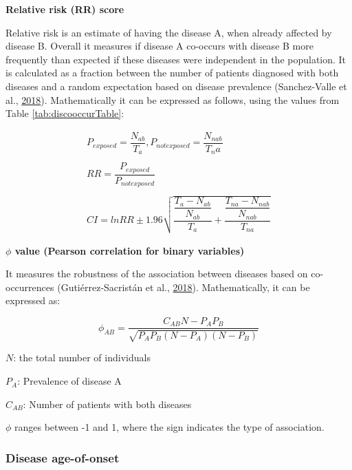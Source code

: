\documentclass[12pt,twoside]{unicam}
\begin{document}
\textbf{Relative risk (RR) score}

Relative risk is an estimate of having the disease A, when already affected by disease B. Overall it measures if disease A co-occurs with disease B more frequently than expected if these diseases were independent in the population. It is calculated as a fraction between the number of patients diagnosed with both diseases and a random expectation based on disease prevalence (Sanchez-Valle et al., \protect\hyperlink{ref-Sanchez-Valle2018}{2018}). Mathematically it can be expressed as follows, using the values from Table \ref{tab:discooccurTable}:

\begin{equation}
\begin{aligned}
    P_{exposed} = \dfrac{N_{ab}}{T_a}, P_{notexposed} = \dfrac{N_{nab}}{T_na} \\\\
    RR = \dfrac{P_{exposed}}{P_{notexposed}} \\\\
    CI = lnRR \pm 1.96 \sqrt{\dfrac{\dfrac{T_a-N_{ab}}{N_{ab}}}{T_a} + \dfrac{\dfrac{T_{na}-N_{nab}}{N_{nab}}}{T_{na}}}
  \label{eq:disRR}
\end{aligned}
\end{equation}

\textbf{\(\phi\) value (Pearson correlation for binary variables)}

It measures the robustness of the association between diseases based on co-occurrences (Gutiérrez-Sacristán et al., \protect\hyperlink{ref-Gutierrez-Sacristan2018}{2018}). Mathematically, it can be expressed as:

\begin{equation}
    \phi_{AB} = \dfrac{C_{AB}N - P_AP_B}{\sqrt{P_AP_B(N-P_A)(N-P_B)}}
  \label{eq:disphi}
\end{equation}

\(N\): the total number of individuals

\(P_{A}\): Prevalence of disease A

\(C_{AB}\): Number of patients with both diseases

\(\phi\) ranges between -1 and 1, where the sign indicates the type of association.

\hypertarget{disease-age-of-onset}{%
\subsubsection{Disease age-of-onset}\label{disease-age-of-onset}}
\end{document}
